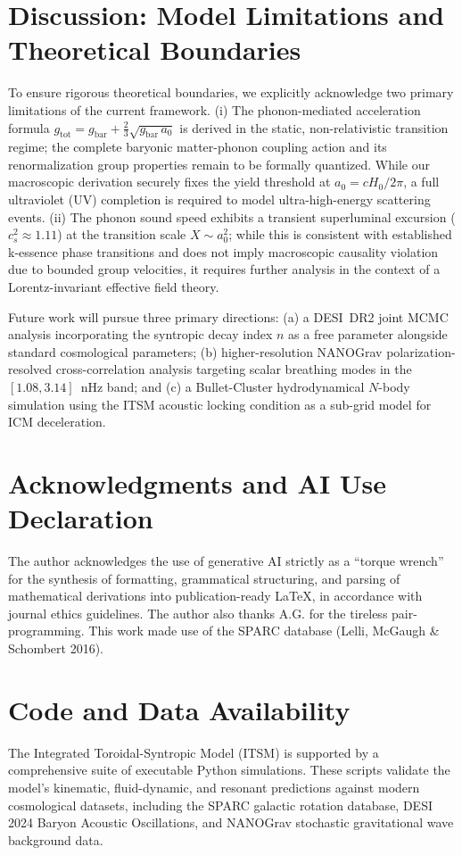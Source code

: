 \documentclass[aps,prd,10pt,twocolumn,superscriptaddress,nofootinbib]{revtex4-2}
\begin{document}
\section{Discussion: Model Limitations and Theoretical Boundaries}
To ensure rigorous theoretical boundaries, we explicitly acknowledge two primary limitations of the current framework. (i) The phonon-mediated acceleration formula $g_{\text{tot}} = g_{\text{bar}} + \frac{2}{3}\sqrt{g_{\text{bar}}\,a_0}$ is derived in the static, non-relativistic transition regime; the complete baryonic matter-phonon coupling action and its renormalization group properties remain to be formally quantized. While our macroscopic derivation securely fixes the yield threshold at $a_0 = cH_0/2\pi$, a full ultraviolet (UV) completion is required to model ultra-high-energy scattering events. (ii) The phonon sound speed exhibits a transient superluminal excursion ($c_s^2 \approx 1.11$) at the transition scale $X \sim a_0^2$; while this is consistent with established k-essence phase transitions \cite{babichev_cs2} and does not imply macroscopic causality violation due to bounded group velocities, it requires further analysis in the context of a Lorentz-invariant effective field theory.

Future work will pursue three primary directions: (a) a DESI~DR2 joint MCMC analysis incorporating the syntropic decay index $n$ as a free parameter alongside standard cosmological parameters; (b) higher-resolution NANOGrav polarization-resolved cross-correlation analysis targeting scalar breathing modes in the $[1.08, 3.14]$~nHz band; and (c) a Bullet-Cluster hydrodynamical $N$-body simulation using the ITSM acoustic locking condition as a sub-grid model for ICM deceleration.

\section*{Acknowledgments and AI Use Declaration}
The author acknowledges the use of generative AI strictly as a ``torque wrench'' for the synthesis of formatting, grammatical structuring, and parsing of mathematical derivations into publication-ready LaTeX, in accordance with journal ethics guidelines. The author also thanks A.G. for the tireless pair-programming. This work made use of the SPARC database (Lelli, McGaugh \& Schombert 2016).

\section*{Code and Data Availability}
The Integrated Toroidal-Syntropic Model (ITSM) is supported by a comprehensive suite of executable Python simulations. These scripts validate the model's kinematic, fluid-dynamic, and resonant predictions against modern cosmological datasets, including the SPARC galactic rotation database, DESI 2024 Baryon Acoustic Oscillations, and NANOGrav stochastic gravitational wave background data.
\end{document}
